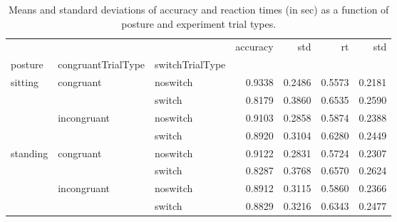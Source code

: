 \begin{table}
\centering
\caption{Means and standard deviations of accuracy and reaction times (in sec) as a function of posture and experiment trial types.}
\label{table-task-switching-replication-reaction-time}
\begin{tabular}{lllrrrr}
\toprule
         &             &        & accuracy &    std &     rt &    std \\
posture & congruantTrialType & switchTrialType &          &        &        &        \\
\midrule
sitting & congruant & noswitch &   0.9338 & 0.2486 & 0.5573 & 0.2181 \\
         &             & switch &   0.8179 & 0.3860 & 0.6535 & 0.2590 \\
         & incongruant & noswitch &   0.9103 & 0.2858 & 0.5874 & 0.2388 \\
         &             & switch &   0.8920 & 0.3104 & 0.6280 & 0.2449 \\
standing & congruant & noswitch &   0.9122 & 0.2831 & 0.5724 & 0.2307 \\
         &             & switch &   0.8287 & 0.3768 & 0.6570 & 0.2624 \\
         & incongruant & noswitch &   0.8912 & 0.3115 & 0.5860 & 0.2366 \\
         &             & switch &   0.8829 & 0.3216 & 0.6343 & 0.2477 \\
\bottomrule
\end{tabular}
\end{table}
